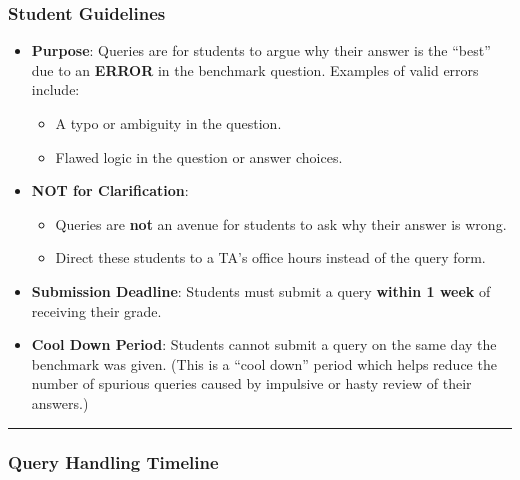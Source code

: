 \documentclass[
]{article}
\providecommand{\tightlist}{%
  \setlength{\itemsep}{0pt}\setlength{\parskip}{0pt}}
\begin{document}
\hypertarget{student-guidelines}{%
\subsubsection{Student Guidelines}\label{student-guidelines}}

\begin{itemize}
\tightlist
\item
  \textbf{Purpose}: Queries are for students to argue why their answer is the ``best'' due to an \textbf{ERROR} in the benchmark question. Examples of valid errors include:

  \begin{itemize}
  \tightlist
  \item
    A typo or ambiguity in the question.\\
  \item
    Flawed logic in the question or answer choices.\\
  \end{itemize}
\item
  \textbf{NOT for Clarification}:

  \begin{itemize}
  \tightlist
  \item
    Queries are \textbf{not} an avenue for students to ask why their answer is wrong.\\
  \item
    Direct these students to a TA's office hours instead of the query form.\\
  \end{itemize}
\item
  \textbf{Submission Deadline}: Students must submit a query \textbf{within 1 week} of receiving their grade.\\
\item
  \textbf{Cool Down Period}: Students cannot submit a query on the same day the benchmark was given. (This is a ``cool down'' period which helps reduce the number of spurious queries caused by impulsive or hasty review of their answers.)
\end{itemize}

\begin{center}\rule{0.5\linewidth}{0.5pt}\end{center}

\hypertarget{query-handling-timeline}{%
\subsubsection{Query Handling Timeline}\label{query-handling-timeline}}
\end{document}
